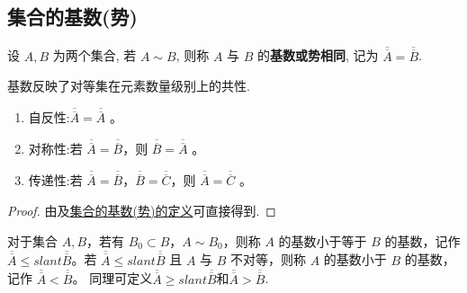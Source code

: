 \documentclass[../../main.tex]{subfiles}
\begin{document}
\subsection{集合的基数(势)}

\begin{definition}[集合的基数(势)]\label{definition:集合的基数(势)}
设 $A, B$ 为两个集合, 若 $A \sim B$, 则称 $A$ 与 $B$ 的\textbf{基数或势相同}, 记为 $\overline{\overline{A}} = \overline{\overline{B}}$.
\end{definition}
\begin{note}
基数反映了对等集在元素数量级别上的共性. 
\end{note}

\begin{theorem}
\begin{enumerate}[(1)]
\item 自反性:$\overline{\overline{A}} = \overline{\overline{A}}$ 。

\item 对称性:若 $\overline{\overline{A}} = \overline{\overline{B}}$，则 $\overline{\overline{B}} = \overline{\overline{A}}$ 。

\item 传递性:若 $\overline{\overline{A}} = \overline{\overline{B}}$，$\overline{\overline{B}} = \overline{\overline{C}}$，则 $\overline{\overline{A}} = \overline{\overline{C}}$ 。
\end{enumerate}
\end{theorem}
\begin{proof}
由及\hyperref[definition:集合的基数(势)]{集合的基数(势)的定义}可直接得到.
\end{proof}

\begin{definition}\label{definition:集合的基数大小关系}
对于集合 $A, B$，若有 $B_0 \subset B$，$A \sim B_0$，则称 $A$ 的基数小于等于 $B$ 的基数，记作 $\overline{\overline{A}} \leqslant slant\overline{\overline{B}}$。若 $\overline{\overline{A}}\leqslant slant \overline{\overline{B}}$ 且 $A$ 与 $B$ 不对等，则称 $A$ 的基数小于 $B$ 的基数，记作 $\overline{\overline{A}} < \overline{\overline{B}}$。
同理可定义$\overline{\overline{A}}\geqslant slant \overline{\overline{B}}$和$\overline{\overline{A}}> \overline{\overline{B}}$.
\end{definition}
\end{document}
